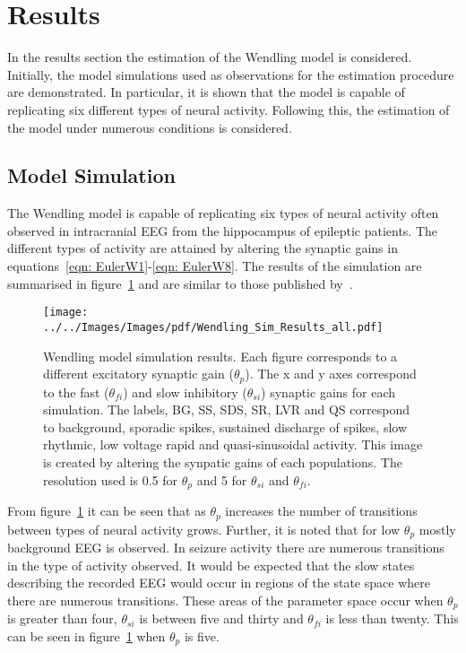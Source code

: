 \section{Results}

In the results section the estimation of the Wendling model is considered. Initially, the model simulations used as observations for the estimation procedure are demonstrated. In particular, it is shown that the model is capable of replicating six different types of neural activity. Following this, the estimation of the model under numerous conditions is considered. 

\subsection{Model Simulation}

The Wendling model is capable of replicating six types of neural activity often observed in intracranial EEG from the hippocampus of epileptic patients. The different types of activity are attained by altering the synaptic gains in equations~\ref{eqn: EulerW1}-\ref{eqn: EulerW8}. The results of the simulation are summarised in figure~\ref{fig: SimResults} and are similar to those published by~\cite{wendling2002epileptic}. 
\begin{figure}%
	\centering
		\texttt{[image: ../../Images/Images/pdf/Wendling\_Sim\_Results\_all.pdf]}
	\caption{Wendling model simulation results. Each figure corresponds to a different excitatory synaptic gain ($\theta_{p}$). The x and y axes correspond to the fast ($\theta_{fi}$) and slow inhibitory ($\theta_{si}$) synaptic gains for each simulation. The labels, BG, SS, SDS, SR, LVR and QS correspond to background, sporadic spikes, sustained discharge of spikes, slow rhythmic, low voltage rapid and quasi-sinusoidal activity. This image is created by altering the synpatic gains of each populations. The resolution used is 0.5 for $\theta_{p}$ and 5 for $\theta_{si}$ and $\theta_{fi}$.}
	\label{fig: SimResults}
\end{figure}%

From figure~\ref{fig: SimResults} it can be seen that as $\theta_{p}$ increases the number of transitions between types of neural activity grows. Further, it is noted that for low $\theta_{p}$ mostly background EEG is observed. In seizure activity there are numerous transitions in the type of activity observed. It would be expected that the slow states describing the recorded EEG would occur in regions of the state space where there are numerous transitions. These areas of the parameter space occur when $\theta_{p}$ is greater than four, $\theta_{si}$ is between five and thirty and $\theta_{fi}$ is less than twenty. This can be seen in figure~\ref{fig: SimResults} when $\theta_{p}$ is five. 

